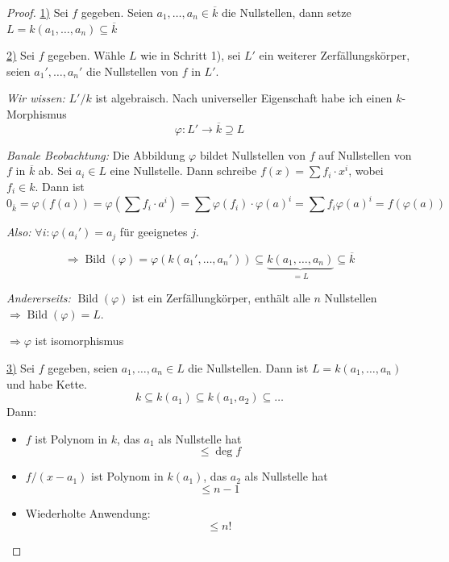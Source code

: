 \documentclass[12pt,parskip=full]{scrartcl}
\newcommand{\heading}{\underline}
\theoremstyle{definition}
\theoremstyle{remark}
\begin{document}
	\begin{proof}
		\heading{1)} Sei $f$ gegeben. Seien $a_1, \dots, a_n \in \overline{k}$ die Nullstellen, dann setze $L = k(a_1, \dots, a_n) \subseteq \overline{k}$
		
		\heading{2)} Sei $f$ gegeben. Wähle $L$ wie in Schritt 1), sei $L'$ ein weiterer Zerfällungskörper, seien $a_1', \dots, a_n'$ die Nullstellen von $f$ in $L'$.
		
		\textit{Wir wissen:} $L'/k$ ist algebraisch. Nach universeller Eigenschaft habe ich einen $k$-Morphismus
		\begin{equation*}
			\varphi: L' \to \overline{k} \supseteq L
		\end{equation*}
		
		\textit{Banale Beobachtung:} Die Abbildung $\varphi$ bildet Nullstellen von $f$ auf Nullstellen von $f$ in $\overline{k}$ ab. Sei $a_i \in L$ eine Nullstelle. Dann schreibe $f(x) = \sum f_i \cdot x^i$, wobei $f_i \in k$. Dann ist
		\begin{equation*}
			0_{\overline{k}} = \varphi(f(a)) = \varphi \left( \sum f_i \cdot a^i \right) = \sum \varphi(f_i) \cdot \varphi(a)^i = \sum f_i \varphi(a)^i = f(\varphi(a))
		\end{equation*}
		
		\textit{Also:} $\forall i: \varphi(a_i') = a_j$ für geeignetes $j$.
		
		\begin{equation*}
			\Rightarrow \operatorname{Bild}(\varphi) = \varphi(k(a_1', \dots, a_n')) \subseteq \underbrace{k(a_1, \dots, a_n)}_{=L} \subseteq \overline{k}
		\end{equation*}
		
		\textit{Andererseits:} $\operatorname{Bild}(\varphi)$ ist ein Zerfällungkörper, enthält alle $n$ Nullstellen $\Rightarrow \operatorname{Bild}(\varphi) = L$.
		
		$\Rightarrow \varphi$ ist isomorphismus
		
		\heading{3)} Sei $f$ gegeben, seien $a_1, \dots, a_n \in L$ die Nullstellen. Dann ist $L = k(a_1, \dots, a_n)$ und habe Kette.
		\begin{equation*}
			k \subseteq k(a_1) \subseteq k(a_1, a_2) \subseteq \dots
		\end{equation*}
		Dann:
		\begin{itemize}
			\item $f$ ist Polynom in $k$, das $a_1$ als Nullstelle hat
			\begin{equation*}
				[k(a_1) : k] \leq \deg f
			\end{equation*}
			\item $f/(x-a_1)$ ist Polynom in $k(a_1)$, das $a_2$ als Nullstelle hat
			\begin{equation*}
				[k(a_1, a_2) : k(a_1)] \leq n - 1
			\end{equation*}
			\item Wiederholte Anwendung:
			\begin{equation*}
				[L:k] \leq n!
			\end{equation*}
		\end{itemize}
		
	\end{proof}
\end{document}
